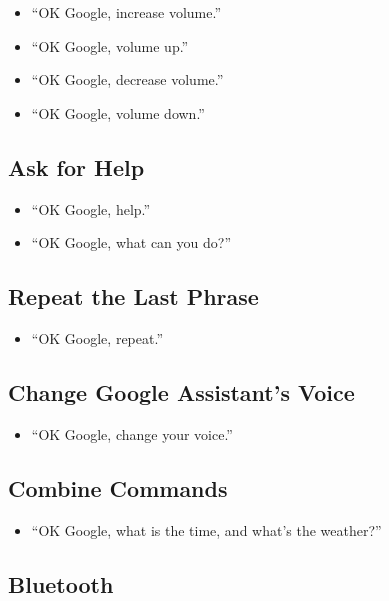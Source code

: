 \documentclass[
  jou,
  floatsintext,
  longtable,
  a4paper,
  nolmodern,
  notxfonts,
  notimes,
  colorlinks=true,linkcolor=blue,citecolor=blue,urlcolor=blue]{apa7}
\providecommand{\tightlist}{%
  \setlength{\itemsep}{0pt}\setlength{\parskip}{0pt}}
\begin{document}
\begin{itemize}
\tightlist
\item
  ``OK Google, increase volume.''
\item
  ``OK Google, volume up.''
\item
  ``OK Google, decrease volume.''
\item
  ``OK Google, volume down.''
\end{itemize}

\subsection{Ask for Help}\label{ask-for-help}

\begin{itemize}
\tightlist
\item
  ``OK Google, help.''
\item
  ``OK Google, what can you do?''
\end{itemize}

\subsection{Repeat the Last Phrase}\label{repeat-the-last-phrase}

\begin{itemize}
\tightlist
\item
  ``OK Google, repeat.''
\end{itemize}

\subsection{Change Google Assistant's
Voice}\label{change-google-assistants-voice}

\begin{itemize}
\tightlist
\item
  ``OK Google, change your voice.''
\end{itemize}

\subsection{Combine Commands}\label{combine-commands}

\begin{itemize}
\tightlist
\item
  ``OK Google, what is the time, and what's the weather?''
\end{itemize}

\subsection{Bluetooth}\label{bluetooth}
\end{document}
